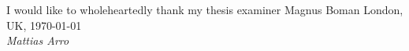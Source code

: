 I would like to wholeheartedly thank my thesis examiner Magnus Boman
\noindent
London, UK, \today \\
\textit{Mattias Arro}
\newpage

